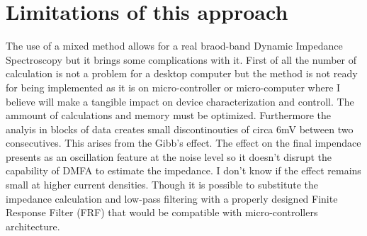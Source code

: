 \section{Limitations of this approach}
The use of a mixed method allows for a real braod-band Dynamic Impedance Spectroscopy but it brings some complications with it.
First of all the number of calculation is not a problem for a desktop computer but the method is not ready for being implemented as it is on micro-controller or micro-computer where I believe will make a tangible impact on device characterization and controll.
The ammount of calculations and memory must be optimized.
Furthermore the analyis in blocks of data creates small discontinouties of circa 6mV between two consecutives. 
This arises from the Gibb's effect.
The effect on the final impendace presents as an oscillation feature at the noise level so it doesn't disrupt the capability of DMFA to estimate the impedance. 
I don't know if the effect remains small at higher current densities.
Though it is possible to substitute the impedance calculation and low-pass filtering with a properly designed Finite Response Filter (FRF) that would be compatible with micro-controllers architecture.







